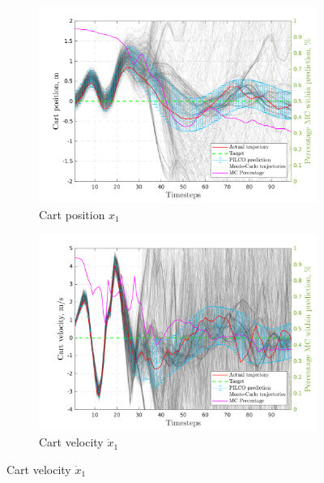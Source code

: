 \begin{figure}[htp!]    
  \begin{subfigure}[b]{0.48\linewidth}
    \centering
    \includegraphics[height=0.22\textheight,width=1\textwidth]{Chapter3/Figures/cdp_MC_rollout_Ep_75_Dim_1.png} 
    \caption{Cart position $x_1$} 
    \label{Fig:Re-cdp-cart-position} 
  \end{subfigure} 
  \hspace{\fill}  %
  \begin{subfigure}[b]{0.48\linewidth}
    \centering
    \includegraphics[height=0.22\textheight,width=1\textwidth]{Chapter3/Figures/cdp_MC_rollout_Ep_75_Dim_2.png} 
    \caption{Cart velocity $\dot{x}_1$} 
    \label{Fig:Re-cdp-cart-velocity} 
  \end{subfigure} 


\end{figure}
